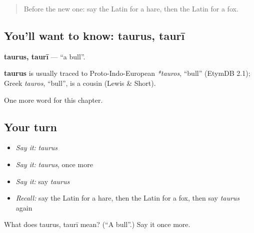 \begin{quote}
Before the new one: say the Latin for a hare, then the Latin for a fox.
\end{quote}

\subsection*{You'll want to know: taurus, taurī}
\textbf{taurus, taurī} — \textquotedblleft{}a bull\textquotedblright{}.

\begin{cousinweb}
\textbf{taurus} is usually traced to Proto-Indo-European \emph{*tauros}, \textquotedblleft{}bull\textquotedblright{} (EtymDB 2.1); Greek \emph{tauros}, \textquotedblleft{}bull\textquotedblright{}, is a cousin (Lewis \& Short).
\end{cousinweb}

\begin{grammarlens}[title={What you've built}]
One more word for this chapter.
\end{grammarlens}

\subsection*{Your turn}
\begin{itemize}
\raggedright
  \item \emph{Say it:} \emph{taurus}
  \item \emph{Say it:} \emph{taurus}, once more
  \item \emph{Say it:} say \emph{taurus}
  \item \emph{Recall:} say the Latin for a hare, then the Latin for a fox, then say \emph{taurus} again
\end{itemize}

\begin{tcolorbox}[breakable,colback=teal!4,colframe=teal!35!black,title={Before you move on}]
What does taurus, taurī mean? (\textquotedblleft{}A bull\textquotedblright{}.) Say it once more.
\end{tcolorbox}

